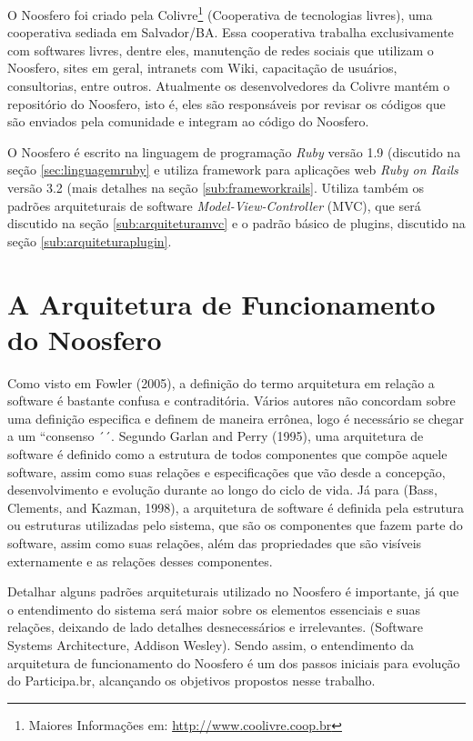 O Noosfero foi criado pela Colivre\footnote{Maiores Informações em: \url{http://www.coolivre.coop.br}} (Cooperativa de tecnologias livres), uma cooperativa sediada em Salvador/BA. Essa cooperativa trabalha exclusivamente com softwares livres, dentre eles, manutenção de redes sociais que utilizam o Noosfero, sites em geral, intranets com Wiki, capacitação de usuários, consultorias, entre outros. Atualmente os desenvolvedores da Colivre mantém o repositório do Noosfero, isto é, eles são responsáveis por revisar os códigos que são enviados pela comunidade e integram ao código do Noosfero.

O Noosfero é escrito na linguagem de programação \textit{Ruby} versão 1.9 (discutido na seção \ref{sec:linguagemruby} e utiliza framework para aplicações web \textit{Ruby on Rails} versão 3.2 (mais detalhes na seção \ref{sub:frameworkrails}. Utiliza também os padrões arquiteturais de software \textit{Model-View-Controller} (MVC), que será discutido na seção \ref{sub:arquiteturamvc} e o padrão básico de plugins, discutido na seção \ref{sub:arquiteturaplugin}. 

\section{A Arquitetura de Funcionamento do Noosfero}

Como visto em Fowler (2005), a definição do termo arquitetura em relação a software é bastante confusa e contraditória. Vários autores não concordam sobre uma definição especifica e definem de maneira errônea, logo é necessário se chegar a um ``consenso ´´. Segundo Garlan and Perry (1995), uma arquitetura de software é definido como a estrutura de todos componentes que compõe aquele software, assim como suas relações e especificações que vão desde a concepção, desenvolvimento e evolução durante ao longo do ciclo de vida. Já para (Bass, Clements, and Kazman, 1998), a arquitetura de software é definida pela estrutura ou estruturas utilizadas pelo sistema, que são os componentes que fazem parte do software, assim como suas relações, além das propriedades que são visíveis externamente e as relações desses componentes.

Detalhar alguns padrões arquiteturais utilizado no Noosfero é importante, já que o entendimento do sistema será maior sobre os elementos essenciais e suas relações, deixando de lado detalhes desnecessários e irrelevantes. (Software Systems Architecture, Addison Wesley). Sendo assim, o entendimento da arquitetura de funcionamento do Noosfero é um dos passos iniciais para evolução do Participa.br, alcançando os objetivos propostos nesse trabalho.



